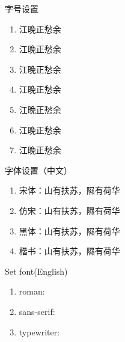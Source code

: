 \documentclass[dvipsnames, svgnames,a4paper,11pt]{article}
\begin{document}
\begin{tbox}{字号设置}
\begin{enumerate}
	\item {\LARGE 江晚正愁余}
	\item {\Large 江晚正愁余}
	\item {\large 江晚正愁余}
	\item {\normalsize 江晚正愁余}
	\item {\small 江晚正愁余}
	\item {\footnotesize 江晚正愁余}
	\item {\scriptsize 江晚正愁余}
\end{enumerate}
\end{tbox}

\begin{tbox}{字体设置（中文）}
\begin{enumerate}
	\item 宋体：{\songti 山有扶苏，隰有荷华}
	\item 仿宋：{\fangsong 山有扶苏，隰有荷华}
	\item 黑体：{\heiti 山有扶苏，隰有荷华}
	\item 楷书：{\kaishu 山有扶苏，隰有荷华}
\end{enumerate}
\end{tbox}

\begin{tbox}{Set font(English)}
\begin{enumerate}
	\item roman:
	\item sans-serif:
	\item typewriter:
\end{enumerate}
\end{tbox}
\end{document}
